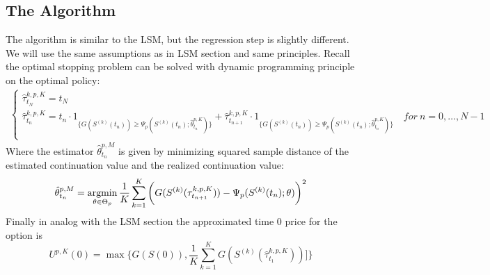 \subsection{The Algorithm}
The algorithm is similar to the LSM, but the regression step is slightly different. We will use the same assumptions as in LSM section and same principles. Recall the optimal stopping problem can be solved with dynamic programming principle on the optimal policy:
\begin{equation*}\label{LSMDynamic3}
\begin{split}
\begin{cases}
          \hat{\tau}_{t_N}^{k,p,K} = t_N\\
          \hat{\tau}_{t_n}^{k,p,K} = t_n \cdot 1_{\{G(S^{(k)}(t_n)) \geq \Psi_p(S^{(k)}(t_n) ; \hat{\theta}_{t_n}^{p,K} ) \}} + \hat{\tau}_{t_{n+1}}^{k,p,K} \cdot 1_{\{G(S^{(k)}(t_n)) \geq \Psi_p(S^{(k)}(t_n) ; \hat{\theta}_{t_n}^{p,K} ) \}} \quad for \ n={0,\ldots,N-1} \\ 
\end{cases}
\end{split}
\end{equation*}
Where the estimator $\hat{\theta}_{t_n}^{p,M}$ is given by minimizing squared sample distance of the estimated continuation value and the realized continuation value:
\begin{align*}
\hat{\theta}_{t_n}^{p,M}= \operatorname*{argmin}_{\theta \in \Theta_p} \dfrac{1}{K} \sum_{k=1}^{K} \bigg(G(S^{(k)}(\tau^{k,p,K}_{t_{n+1}}))  - \Psi_p(S^{(k)}(t_n) ; \theta ) \bigg)^2
\end{align*}
Finally in analog with the LSM section the approximated time 0 price for the option is
\begin{equation}
U^{p,K}(0) = \max \{ G(S(0)), \frac{1}{K} \sum_{k=1}^{K} G(S^{(k)}(\hat{\tau}^{k,p,K}_{t_1}))]\}
\end{equation}


\newpage


